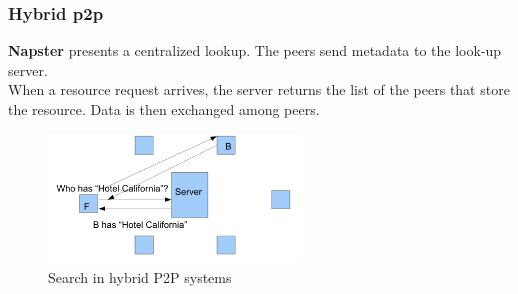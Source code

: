 \documentclass[paper=a4, fontsize=11pt]{scrartcl} %
\numberwithin{equation}{section} %
\numberwithin{figure}{section} %
\numberwithin{table}{section} %
\begin{document}
\subsubsection*{Hybrid p2p}
\textbf{Napster} presents a centralized lookup. The peers send metadata to the look-up server.\\
When a resource request arrives, the server returns the list of the peers that store the resource. Data is then exchanged among peers.
 \begin{figure}[H]
  \centering
  \includegraphics[width=0.6\textwidth]{img/search_n.png}
  \caption{Search in hybrid P2P systems}
  
\end{figure}
\end{document}
